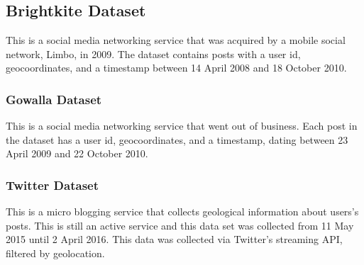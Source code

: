 \documentclass[twocolumn,10pt]{asme2ej}
\begin{document}
\subsection{Brightkite Dataset}

This is a social media networking service that was acquired by a mobile social network, Limbo, in 2009. The dataset contains posts with a user id, geocoordinates, and a timestamp between 14 April 2008 and 18 October 2010.
\subsubsection{Gowalla Dataset}
This is a social media networking service that went out of business. Each post in the dataset has a user id, geocoordinates, and a timestamp, dating between 23 April 2009 and 22 October 2010.


\subsubsection{Twitter Dataset}
This is a micro blogging service that collects geological information about users's posts. This is still an active service and this data set was collected from 11 May 2015 until 2 April 2016. This data was collected via Twitter's streaming API, filtered by geolocation.
\end{document}
